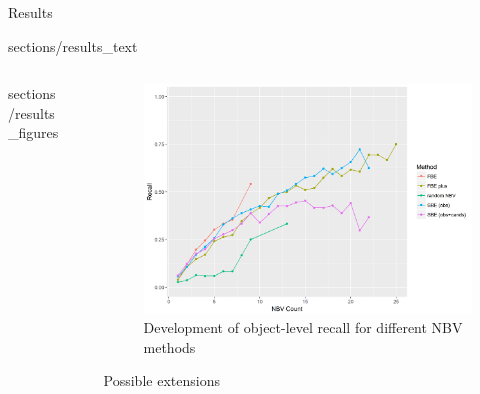 \documentclass[final,20pt]{beamer}
\newlength{\sepwid}
\newlength{\onecolwid}
\newlength{\twocolwid}
\begin{document}
\begin{frame}[t]
\begin{columns}[t]
\begin{column}{\twocolwid}
\begin{block}{Results}

{sections/results_text}

\begin{columns}[t, totalwidth=\twocolwid]

  \begin{column}{\onecolwid}


		{sections/results_figures}

  	
  \end{column}

  \begin{column}{\sepwid}
	\end{column} %

	\begin{column}{\onecolwid}	

		\begin{figure}
			\includegraphics[width=0.8\linewidth]{src/Plots/recall_vs_nbv_count_scattered.png}
			\caption{Development of object-level recall for different NBV methods}
		\end{figure}

		\vspace{0.5cm}
  	

		\begin{block}{Possible extensions}
		

\end{block}
\end{column}
\end{columns}
\end{block}
\end{column}
\end{columns}
\end{frame}
\end{document}
